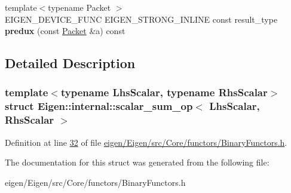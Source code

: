 \begin{DoxyCompactItemize}
\item 
\mbox{\label{struct_eigen_1_1internal_1_1scalar__sum__op_a5aa5590c6f4545b2486f8de96fc6dc9c}} 
{\footnotesize template$<$typename Packet $>$ }\\E\+I\+G\+E\+N\+\_\+\+D\+E\+V\+I\+C\+E\+\_\+\+F\+U\+NC E\+I\+G\+E\+N\+\_\+\+S\+T\+R\+O\+N\+G\+\_\+\+I\+N\+L\+I\+NE const result\+\_\+type {\bfseries predux} (const \hyperlink{union_eigen_1_1internal_1_1_packet}{Packet} \&a) const
\end{DoxyCompactItemize}


\subsection{Detailed Description}
\subsubsection*{template$<$typename Lhs\+Scalar, typename Rhs\+Scalar$>$\newline
struct Eigen\+::internal\+::scalar\+\_\+sum\+\_\+op$<$ Lhs\+Scalar, Rhs\+Scalar $>$}



Definition at line \hyperlink{eigen_2_eigen_2src_2_core_2functors_2_binary_functors_8h_source_l00032}{32} of file \hyperlink{eigen_2_eigen_2src_2_core_2functors_2_binary_functors_8h_source}{eigen/\+Eigen/src/\+Core/functors/\+Binary\+Functors.\+h}.



The documentation for this struct was generated from the following file\+:\begin{DoxyCompactItemize}
\item 
eigen/\+Eigen/src/\+Core/functors/\+Binary\+Functors.\+h\end{DoxyCompactItemize}
